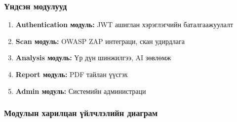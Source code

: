 \documentclass[main.tex]{subfiles}
\begin{document}
\subsubsection{Үндсэн модулууд}
\begin{enumerate}
    \item \textbf{Authentication модуль:} JWT ашиглан хэрэглэгчийн баталгаажуулалт
    \item \textbf{Scan модуль:} OWASP ZAP интеграци, скан удирдлага
    \item \textbf{Analysis модуль:} Үр дүн шинжилгээ, AI зөвлөмж
    \item \textbf{Report модуль:} PDF тайлан үүсгэх
    \item \textbf{Admin модуль:} Системийн администраци
\end{enumerate}

\subsubsection{Модулын харилцан үйлчлэлийн диаграм}
\end{document}
